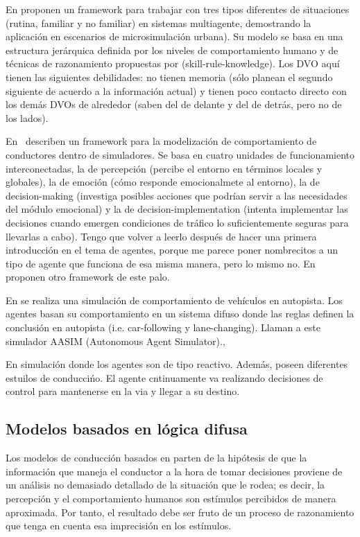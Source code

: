 En \cite{Chaib-draa1994} proponen un framework para trabajar con tres tipos diferentes de situaciones (rutina, familiar y no familiar) en sistemas multiagente, demostrando la aplicación en escenarios de microsimulación urbana). Su modelo se basa en una estructura jerárquica definida por los niveles de comportamiento humano y de técnicas de razonamiento propuestas por \cite{Rasmussen1986} (skill-rule-knowledge). Los DVO aquí tienen las siguientes debilidades: no tienen memoria (sólo planean el segundo siguiente de acuerdo a la información actual) y tienen poco contacto directo con los demás DVOs de alrededor (saben del de delante y del de detrás, pero no de los lados).

En~\cite{al2001framework} describen un framework para la modelización de comportamiento de conductores dentro de simuladores. Se basa en cuatro unidades de funcionamiento interconectadas, la de percepción (percibe el entorno en términos locales y globales), la de emoción (cómo responde emocionalmete al entorno), la de decision-making (investiga posibles acciones que podrían servir a las necesidades del módulo emocional) y la de decision-implementation (intenta implementar las decisiones cuando emergen condiciones de tráfico lo suficientemente seguras para llevarlas a cabo). Tengo que volver a leerlo después de hacer una primera introducción en el tema de agentes, porque me parece poner nombrecitos a un tipo de agente que funciona de esa misma manera, pero lo mismo no. En \cite{Kuge2000} proponen otro framework de este palo.

En \cite{Das} se realiza una simulación de comportamiento de vehículos en autopista. Los agentes basan su comportamiento en un sistema difuso donde las reglas definen la conclusión en autopista (i.e. car-following y lane-changing). Llaman a este simulador AASIM (Autonomous Agent Simulator).,

En \cite{Ehlert2001} simulación donde los agentes son de tipo reactivo. Además, poseen diferentes estuilos de conduccińo. El agente cntinuamente va realizando decisiones de control para mantenerse en la via y llegar a su destino.


\subsection{Modelos basados en lógica difusa}

Los modelos de conducción basados en  parten de la hipótesis de que la información que maneja el conductor a la hora de tomar decisiones proviene de un análisis no demasiado detallado de la situación que le rodea; es decir, la percepción y el comportamiento humanos son estímulos percibidos de manera aproximada. Por tanto, el resultado debe ser fruto de un proceso de razonamiento que tenga en cuenta esa imprecisión en los estímulos.


